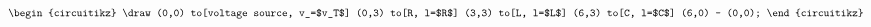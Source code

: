 \documentclass[preview]{standalone}
\begin{document}
\begin{align*}
\begin{circuitikz}
                \draw (0,0) to[voltage source, v_=$v_T$] (0,3) %
                to[R, l=$R$] (3,3) %
                to[L, l=$L$] (6,3) %
                to[C, l=$C$] (6,0) %
                -- (0,0); %
            \end{circuitikz}
\end{align*}
\end{document}
